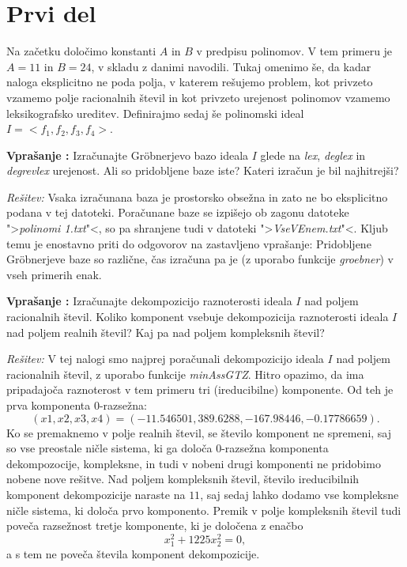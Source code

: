 \documentclass[a4paper, 10pt]{article}
\newcounter{vprcount}
\newenvironment{Vpr}{\begin{flushleft}\stepcounter{vprcount}\textbf{Vprašanje \arabic{vprcount}:}}{\hfill\end{flushleft}}
\newenvironment{Rešitev}{\begin{flushleft}\textit{Rešitev:}}{\hfill\end{flushleft}}
\begin{document}
	\section{Prvi del}
		Na začetku določimo konstanti $A$ in $B$ v predpisu polinomov. V tem primeru je $A = 11$ in $B=24$, v skladu z danimi navodili. Tukaj omenimo še, da kadar naloga eksplicitno ne poda polja, v katerem rešujemo problem, kot privzeto vzamemo polje racionalnih števil in kot privzeto urejenost polinomov vzamemo leksikografsko ureditev. Definirajmo sedaj še polinomski ideal $I = <f_1, f_2, f_3, f_4 >$.
		\begin{Vpr}
			Izračunajte Gröbnerjevo bazo ideala $I$ glede na \emph{lex}, \emph{deglex} in \emph{degrevlex} urejenost. Ali so pridobljene baze iste? Kateri izračun je bil najhitrejši?
		\end{Vpr}
		\begin{Rešitev}
		 	Vsaka izračunana baza je prostorsko obsežna in zato ne bo eksplicitno podana v tej datoteki. Poračunane baze se izpišejo ob zagonu datoteke ">\emph{polinomi 1.txt}"<, so pa shranjene tudi v datoteki ">\emph{VseVEnem.txt}"<. Kljub temu je enostavno priti do odgovorov na zastavljeno vprašanje: Pridobljene Gröbnerjeve baze so različne, čas izračuna pa je (z uporabo funkcije \emph{groebner}) v vseh primerih enak.
		\end{Rešitev}
		\begin{Vpr}
		 	Izračunajte dekompozicijo raznoterosti ideala $I$ nad poljem racionalnih števil. Koliko komponent vsebuje dekompozicija raznoterosti ideala $I$ nad poljem realnih števil? Kaj pa nad poljem kompleksnih števil?
		\end{Vpr}
		\begin{Rešitev}
		 	V tej nalogi smo najprej poračunali dekompozicijo ideala $I$ nad poljem racionalnih števil, z uporabo funkcije \emph{minAssGTZ}. Hitro opazimo, da ima pripadajoča raznoterost v tem primeru tri (ireducibilne) komponente. Od teh je prva komponenta $0$-razsežna: $$(x1, x2, x3, x4) = (-11.546501, 389.6288, -167.98446, -0.17786659).$$ Ko se premaknemo v polje realnih števil, se število komponent ne spremeni, saj so vse preostale ničle sistema, ki ga določa $0$-razsežna komponenta dekompozocije, kompleksne, in tudi v nobeni drugi komponenti ne pridobimo nobene nove rešitve. Nad poljem kompleksnih števil, število ireducibilnih komponent dekompozicije naraste na $11$, saj sedaj lahko dodamo vse kompleksne ničle sistema, ki določa prvo komponento. Premik v polje kompleksnih števil tudi poveča razsežnost tretje komponente, ki je določena z enačbo $$x_1^2 + 1225x_2^2 = 0,$$ a s tem ne poveča števila komponent dekompozicije.
		\end{Rešitev}
\end{document}

